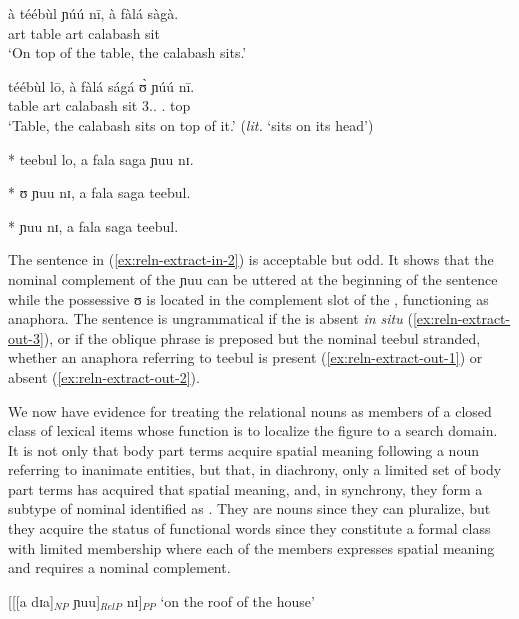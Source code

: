 \begin{exe}
\begin{exe}
\begin{exe}
\begin{exe}
\begin{exe}
\begin{exe}
\begin{exe}
\begin{exe}
\ea\label{ex:reln-extract-in-1}
\gll  à téébùl  ɲúú nī, à fàlá sàgà.\\
 {\sc art } table {\reln} {\postp}  {\sc art } calabash sit\\
\glt `On top of the table, the calabash sits.'

 \ex\label{ex:reln-extract-in-2}
\gll  téébùl lō, à fàlá ságá ʊ̀   ɲúú nī.\\
 table {\foc} {\sc art} calabash sit {3.\sg.\poss} {\reln. top} {\postp}\\
\glt `Table, the calabash sits on top of it.' ({\it lit.} `sits on its head')

 \ex\label{ex:reln-extract-out-3}
*  teebul lo, a fala saga  ɲuu nɪ.

 \ex\label{ex:reln-extract-out-1}
 *  ʊ  ɲuu nɪ, a fala saga teebul.
 
 \ex\label{ex:reln-extract-out-2}
 * ɲuu nɪ, a fala saga teebul.

\z
\z

The sentence in  (\ref{ex:reln-extract-in-2}) is acceptable but odd. It shows that the nominal complement of the  {\sls ɲuu} can be uttered at the beginning of the sentence while the possessive  {\sls ʊ}  is located  in the complement slot of   the , functioning as anaphora. The sentence is ungrammatical if the  is absent {\it in situ} (\ref{ex:reln-extract-out-3}),  or if the oblique phrase is preposed but the nominal {\sls teebul} stranded, whether an anaphora referring to {\sls teebul} is present  (\ref{ex:reln-extract-out-1}) or absent (\ref{ex:reln-extract-out-2}). 


We now have  evidence for treating the relational nouns as
members of a closed class of lexical items whose function is to localize the
figure to a search domain.  It is not only that body part terms acquire spatial meaning
following a noun referring to inanimate entities, but that, in diachrony, 
only a limited set of body part terms has acquired that spatial meaning,  and, in synchrony,  they form a subtype of nominal identified as . They are 
nouns since they can pluralize, but they acquire the status of functional words
since they constitute a formal class with limited membership where each of
the members expresses spatial meaning and requires a nominal complement.

\ea\label{ex:postp-struct}
 {\rm [[[{\sls a dɪa}]$_{NP}$ {\sls ɲuu}]$_{RelP}$ {\sls nɪ}]$_{PP}$   {\rm`on the roof of the house' }}
\z


\end{exe}
\end{exe}
\end{exe}
\end{exe}
\end{exe}
\end{exe}
\end{exe}
\end{exe}
